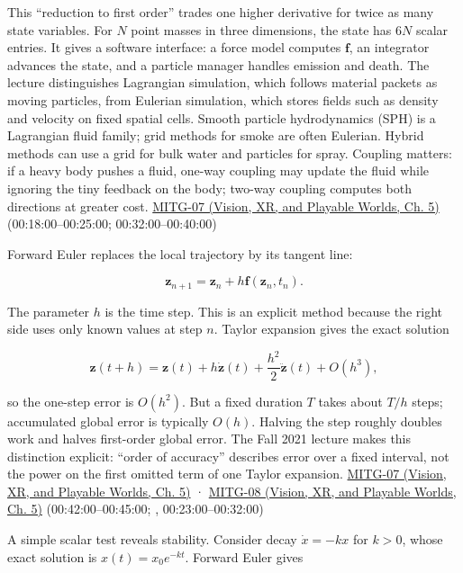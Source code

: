 This ``reduction to first order'' trades one higher derivative for twice as many state variables. For \(N\) point masses in three dimensions, the state has \(6N\) scalar entries. It gives a software interface: a force model computes \(\boldsymbol{f}\), an integrator advances the state, and a particle manager handles emission and death. The lecture distinguishes Lagrangian simulation, which follows material packets as moving particles, from Eulerian simulation, which stores fields such as density and velocity on fixed spatial cells. Smooth particle hydrodynamics (SPH) is a Lagrangian fluid family; grid methods for smoke are often Eulerian. Hybrid methods can use a grid for bulk water and particles for spray. Coupling matters: if a heavy body pushes a fluid, one-way coupling may update the fluid while ignoring the tiny feedback on the body; two-way coupling computes both directions at greater cost. \href{../07-Vision-XR-and-Playable-Worlds/main.pdf\#nameddest=04-visual-computing-ii-ch036-mitg-07---particle-systems}{MITG-07 (Vision, XR, and Playable Worlds, Ch. 5)} (00:18:00--00:25:00; 00:32:00--00:40:00)

Forward Euler replaces the local trajectory by its tangent line:

\[
\boldsymbol{z}_{n+1}=\boldsymbol{z}_n+h\boldsymbol{f}(\boldsymbol{z}_n,t_n).
\]

The parameter \(h\) is the time step. This is an explicit method because the right side uses only known values at step \(n\). Taylor expansion gives the exact solution

\[
\boldsymbol{z}(t+h)=\boldsymbol{z}(t)+h\dot{\boldsymbol{z}}(t)
+\frac{h^2}{2}\ddot{\boldsymbol{z}}(t)+O(h^3),
\]

so the one-step error is \(O(h^2)\). But a fixed duration \(T\) takes about \(T/h\) steps; accumulated global error is typically \(O(h)\). Halving the step roughly doubles work and halves first-order global error. The Fall 2021 lecture makes this distinction explicit: ``order of accuracy'' describes error over a fixed interval, not the power on the first omitted term of one Taylor expansion. \href{../07-Vision-XR-and-Playable-Worlds/main.pdf\#nameddest=04-visual-computing-ii-ch036-mitg-07---particle-systems}{MITG-07 (Vision, XR, and Playable Worlds, Ch. 5)} · \href{../07-Vision-XR-and-Playable-Worlds/main.pdf\#nameddest=04-visual-computing-ii-ch036-mitg-08---cloth-simulation}{MITG-08 (Vision, XR, and Playable Worlds, Ch. 5)} (00:42:00--00:45:00; , 00:23:00--00:32:00)

A simple scalar test reveals stability. Consider decay \(\dot{x}=-kx\) for \(k>0\), whose exact solution is \(x(t)=x_0e^{-kt}\). Forward Euler gives

